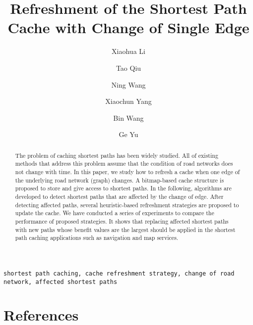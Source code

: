 \documentclass[review]{elsarticle}
\begin{document}
\begin{frontmatter}

\title{Refreshment of the Shortest Path Cache with Change of Single Edge}

\author[address1]{Xiaohua Li}
\author[address1]{Tao Qiu}
\author[address2]{Ning Wang}
\author[address1]{Xiaochun Yang}
\author[address1]{Bin Wang}
\author[address1]{Ge Yu}
\address[address1]{School of Computer Science and Engineering, Northeastern University, Liaoning, China}

\address[address2]{Department of Information Management, School of Management, Shanghai University, Shanghai, China}




\begin{abstract}
The problem of caching shortest paths has been widely studied.
All of existing methods that address this problem assume that the condition of road networks does not change with time.
In this paper, we study how to refresh a cache when one edge of the underlying road network (graph) changes. A bitmap-based cache structure is proposed to store and give access to shortest paths. In the following, algorithms are developed to detect shortest paths that are affected by the change of edge. After detecting affected paths, several heuristic-based refreshment strategies are proposed to update the cache. We have conducted a series of experiments to compare the performance of proposed strategies. It shows that replacing affected shortest paths with new paths whose benefit values are the largest should be applied in the shortest path caching applications such as navigation and map services.
\end{abstract}

\begin{keyword}
\texttt{shortest path caching, cache refreshment strategy, change of road network, affected shortest paths}
\end{keyword}

\end{frontmatter}

\linenumbers


%





\section*{References}

\end{document}
